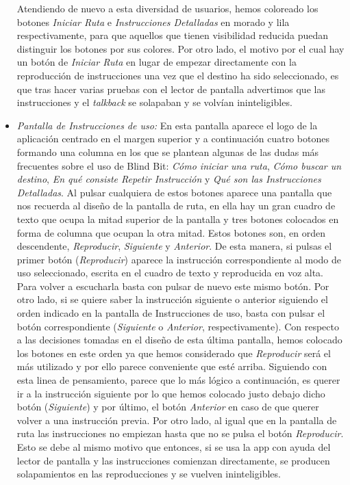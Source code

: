 \begin{itemize}
	Atendiendo de nuevo a esta diversidad de usuarios, hemos coloreado los botones \textit{Iniciar Ruta} e \textit{Instrucciones Detalladas} en morado y lila respectivamente, para que aquellos que tienen visibilidad reducida puedan distinguir los botones por sus colores. Por otro lado, el motivo por el cual hay un botón de \textit{Iniciar Ruta} en lugar de empezar directamente con la reproducción de instrucciones una vez que el destino ha sido seleccionado, es que tras hacer varias pruebas con el lector de pantalla advertimos que las instrucciones y el \textit{talkback} se solapaban y se volvían ininteligibles.
	
	\item \textit{Pantalla de Instrucciones de uso:} En esta pantalla aparece el logo de la aplicación centrado en el margen superior y a continuación cuatro botones formando una columna en los que se plantean algunas de las dudas más frecuentes sobre el uso de Blind Bit: \textit{Cómo iniciar una ruta}, \textit{Cómo buscar un destino}, \textit{En qué consiste Repetir Instrucción} y \textit{Qué son las Instrucciones Detalladas}. Al pulsar cualquiera de estos botones aparece una pantalla que nos recuerda al diseño de la pantalla de ruta, en ella hay un gran cuadro de texto que ocupa la mitad superior de la pantalla y tres botones colocados en forma de columna que ocupan la otra mitad. Estos botones son, en orden descendente, \textit{Reproducir}, \textit{Siguiente} y \textit{Anterior}. De esta manera, si pulsas el primer botón (\textit{Reproducir}) aparece la instrucción correspondiente al modo de uso seleccionado, escrita en el cuadro de texto y reproducida en voz alta. Para volver a escucharla basta con pulsar de nuevo este mismo botón. Por otro lado, si se quiere saber la instrucción siguiente o anterior siguiendo el orden indicado en la pantalla de Instrucciones de uso, basta con pulsar el botón correspondiente (\textit{Siguiente} o \textit{Anterior}, respectivamente). Con respecto a las decisiones tomadas en el diseño de esta última pantalla, hemos colocado los botones en este orden ya que hemos considerado que \textit{Reproducir} será el más utilizado y por ello parece conveniente que esté arriba. Siguiendo con esta linea de pensamiento, parece que lo más lógico a continuación, es querer ir a la instrucción siguiente por lo que hemos colocado justo debajo dicho botón (\textit{Siguiente}) y por último, el botón \textit{Anterior} en caso de que querer volver a una instrucción previa. Por otro lado, al igual que en la pantalla de ruta las instrucciones no empiezan hasta que no se pulsa el botón \textit{Reproducir}. Esto se debe al mismo motivo que entonces, si se usa la app con ayuda del lector de pantalla y las instrucciones comienzan directamente, se producen solapamientos en las reproducciones y se vuelven ininteligibles.
\end{itemize}



